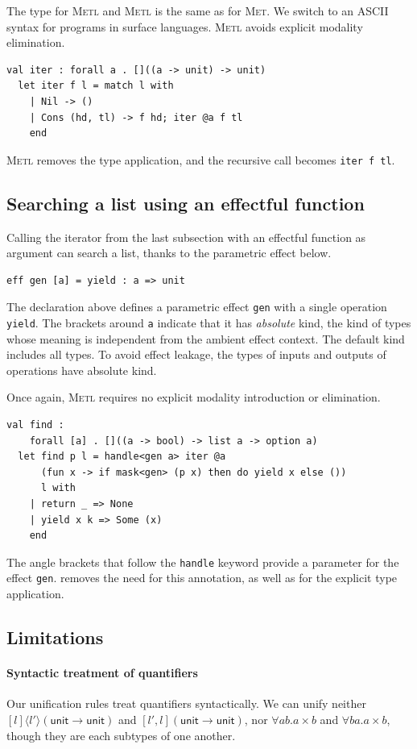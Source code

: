 \documentclass[sigplan, nonacm, natbib = false, review, screen]{acmart}
\newcommand{\Met}{\textsc{Met}\xspace}
\newcommand{\MetlFrost}{\text{Frost-}\textsc{Metl}\xspace}
\newcommand{\Frost}{\text{Frost}\xspace}
\newcommand{\MetlF}{\text{F-}\textsc{Metl}\xspace}
\begin{document}
The type for \MetlF and \MetlFrost is the same as for \Met. We switch to an
ASCII syntax for programs in surface languages.
%
\MetlF avoids explicit modality elimination.
\begin{lstlisting}[style=metl]
  val iter : forall a . []((a -> unit) -> unit)
  let iter f l = match l with
    | Nil -> ()
    | Cons (hd, tl) -> f hd; iter @a f tl
    end
\end{lstlisting}
\MetlFrost removes the type application, and the recursive call becomes
\lstinline[style=metl]{iter f tl}.

\subsection{Searching a list using an effectful function}
Calling the iterator from the last subsection with an effectful function as
argument can search a list, thanks to the parametric effect below.
\begin{lstlisting}[style=metl]
  eff gen [a] = yield : a => unit
\end{lstlisting}
The declaration above defines a parametric effect \lstinline[style=metl]{gen}
with a single operation \lstinline[style=metl]{yield}. The brackets around
\lstinline[style=metl]{a} indicate that it has \emph{absolute} kind, the kind of
types whose meaning is independent from the ambient effect context. The default
kind includes all types. To avoid effect leakage, the types of inputs and
outputs of operations have absolute kind.

Once again, \MetlF requires no explicit modality introduction or elimination.
\begin{lstlisting}[style=metl]
  val find :
    forall [a] . []((a -> bool) -> list a -> option a)
  let find p l = handle<gen a> iter @a
      (fun x -> if mask<gen> (p x) then do yield x else ())
      l with
    | return _ => None
    | yield x k => Some (x)
    end
\end{lstlisting}
The angle brackets that follow the \lstinline[style=metl]{handle} keyword
provide a parameter for the effect \lstinline[style=metl]{gen}. \Frost removes
the need for this annotation, as well as for the explicit type application.

\subsection{Limitations}
\paragraph{Syntactic treatment of quantifiers}
Our unification rules treat quantifiers syntactically. We can unify neither
$[l]\langle l'\rangle(\textsf{unit}\to\textsf{unit})$ and $[l',
  l](\textsf{unit}\to\textsf{unit})$, nor $\forall a b . a \times b$ and
$\forall b a . a \times b$, though they are each subtypes of one another.
\end{document}

